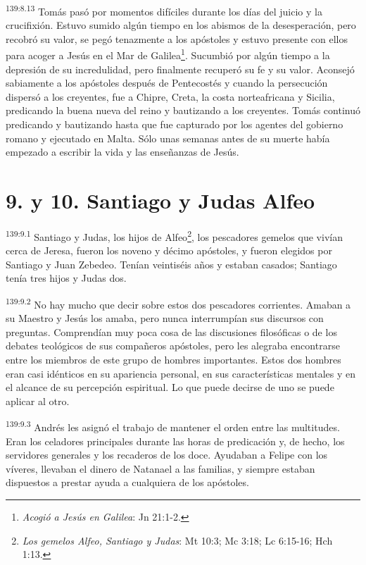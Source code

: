 \par
\textsuperscript{139:8.13} Tomás pasó por momentos difíciles durante los días del juicio y la crucifixión. Estuvo sumido algún tiempo en los abismos de la desesperación, pero recobró su valor, se pegó tenazmente a los apóstoles y estuvo presente con ellos para acoger a Jesús en el Mar de Galilea\footnote{\textit{Acogió a Jesús en Galilea}: Jn 21:1-2.}. Sucumbió por algún tiempo a la depresión de su incredulidad, pero finalmente recuperó su fe y su valor. Aconsejó sabiamente a los apóstoles después de Pentecostés y cuando la persecución dispersó a los creyentes, fue a Chipre, Creta, la costa norteafricana y Sicilia, predicando la buena nueva del reino y bautizando a los creyentes. Tomás continuó predicando y bautizando hasta que fue capturado por los agentes del gobierno romano y ejecutado en Malta. Sólo unas semanas antes de su muerte había empezado a escribir la vida y las enseñanzas de Jesús.

\section*{9. y 10. Santiago y Judas Alfeo}
\par
\textsuperscript{139:9.1} Santiago y Judas, los hijos de Alfeo\footnote{\textit{Los gemelos Alfeo, Santiago y Judas}: Mt 10:3; Mc 3:18; Lc 6:15-16; Hch 1:13.}, los pescadores gemelos que vivían cerca de Jeresa, fueron los noveno y décimo apóstoles, y fueron elegidos por Santiago y Juan Zebedeo. Tenían veintiséis años y estaban casados; Santiago tenía tres hijos y Judas dos.

\par
\textsuperscript{139:9.2} No hay mucho que decir sobre estos dos pescadores corrientes. Amaban a su Maestro y Jesús los amaba, pero nunca interrumpían sus discursos con preguntas. Comprendían muy poca cosa de las discusiones filosóficas o de los debates teológicos de sus compañeros apóstoles, pero les alegraba encontrarse entre los miembros de este grupo de hombres importantes. Estos dos hombres eran casi idénticos en su apariencia personal, en sus características mentales y en el alcance de su percepción espiritual. Lo que puede decirse de uno se puede aplicar al otro.

\par
\textsuperscript{139:9.3} Andrés les asignó el trabajo de mantener el orden entre las multitudes. Eran los celadores principales durante las horas de predicación y, de hecho, los servidores generales y los recaderos de los doce. Ayudaban a Felipe con los víveres, llevaban el dinero de Natanael a las familias, y siempre estaban dispuestos a prestar ayuda a cualquiera de los apóstoles.

